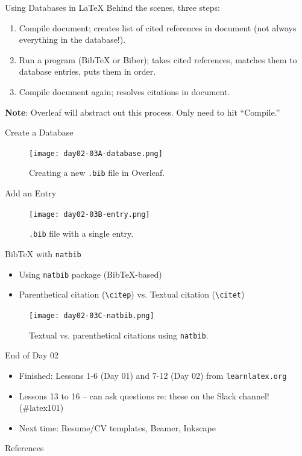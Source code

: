 \documentclass{beamer}
\begin{document}
{  \begin{frame}{Using Databases in \LaTeX}
    Behind the scenes, three steps:
    \begin{enumerate}
      \item Compile document; creates list of cited references in document (not always everything in the database!).
      \item Run a program (BibTeX or Biber); takes cited references, matches them to database entries, puts them in order.
      \item Compile document again; resolves citations in document.
    \end{enumerate}
    \textbf{Note}: Overleaf will abstract out this process. Only need to hit ``Compile.''
  \end{frame}

  \begin{frame}{Create a Database}
    \begin{figure}
      \texttt{[image: day02-03A-database.png]}
      \caption{Creating a new \texttt{.bib} file in Overleaf.}
      \label{fig:day02-03A}
    \end{figure}
  \end{frame}

  \begin{frame}{Add an Entry}
    \begin{figure}
      \texttt{[image: day02-03B-entry.png]}
      \caption{\texttt{.bib} file with a single entry.}
      \label{fig:day02-03B}
    \end{figure}
  \end{frame}

  \begin{frame}{BibTeX with \texttt{natbib}}
    \begin{itemize}
      \item Using \texttt{natbib} package (BibTeX-based)
      \item Parenthetical citation (\texttt{\textbackslash citep}) vs. Textual citation (\texttt{\textbackslash citet})
    \end{itemize}
    \begin{figure}
      \texttt{[image: day02-03C-natbib.png]}
      \caption{Textual vs. parenthetical citations using \texttt{natbib}.}
      \label{fig:day02-03C}
    \end{figure}
  \end{frame}

\begin{frame}{End of Day 02}
  \begin{itemize}
    \item Finished: Lessons 1-6 (Day 01) and 7-12 (Day 02) from \texttt{learnlatex.org}
    \item Lessons 13 to 16 -- can ask questions re: these on the Slack channel! (\#latex101)
    \item Next time: Resume/CV templates, Beamer, Inkscape
  \end{itemize}
\end{frame}

\begin{frame}{References}
  
  
\end{frame}

} %
\end{document}

